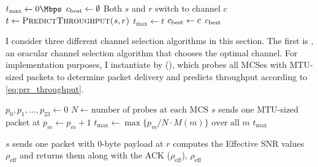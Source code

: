 \begin{algorithm}[htp]
\caption{\label{alg:chan_sel_basic}}
\begin{algorithmic}
\STATE $t_{\max}\gets 0\Mbps$
\STATE $c_{\mathrm{best}} \gets \emptyset$
\STATE Both $s$ and $r$ switch to channel $c$
\STATE $t \gets \textsc{PredictThroughput($s, r$)}$
	\STATE $t_{\max} \gets t$
	\STATE $c_{\mathrm{best}} \gets c$
\ENDIF
\RETURN $c_{\mathrm{best}}$
\ENDFOR
\end{algorithmic}
\end{algorithm}

I consider three different channel selection algorithms in this section. The first is , an oracular channel selection algorithm that chooses the optimal channel. For implementation purposes, I instantiate  by  (), which probes all MCSes with MTU-sized packets to determine packet delivery and predicts throughput according to \eqref{eq:prr_throughput}.

\begin{algorithm}[tp]
\caption{\label{alg:chan_sel_probe}}
\begin{algorithmic}
\STATE $p_0,p_1,\dots,p_{23} \gets 0$
\STATE $N \gets \text{number of probes at each MCS}$
\STATE $s$ sends one MTU-sized packet at 
\STATE $p_m \gets p_m + 1$
\ENDIF
\ENDFOR
\ENDFOR
\STATE $t_{\max}\gets \max \{p_m/N \cdot M(m)\} \text{ over all } m$ \hfill \COMMENT{\eqref{eq:prr_throughput}}
\RETURN $t_{\max}$
\end{algorithmic}
\end{algorithm}
\begin{algorithm}[tp]
\caption{\label{alg:chan_sel_esnr}}
\begin{algorithmic}
\STATE $s$ sends one packet with 0-byte payload at 
\STATE $r$ computes the Effective SNR values $\rho_\text{eff}$ and returns them along with the ACK
	\RETURN {}($\rho_\text{eff}$), $\rho_\text{eff}$ \hfill {}
\ENDIF
\ENDFOR
{}
\end{algorithmic}
\end{algorithm}

